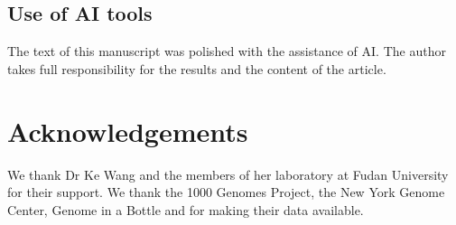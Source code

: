 \documentclass[a4paper,num-refs,gigabyte]{oup-contemporary}%
\begin{document}
\subsection{Use of AI tools}
The text of this manuscript was polished with the assistance of AI. The author takes full responsibility for the results and the content of the article.

\section{Acknowledgements}
We thank Dr Ke Wang and the members of her laboratory at Fudan University for their support. We thank the 1000 Genomes Project, the New York Genome Center, Genome in a Bottle and \citet{hilgers2025} for making their data available.


\end{document}
